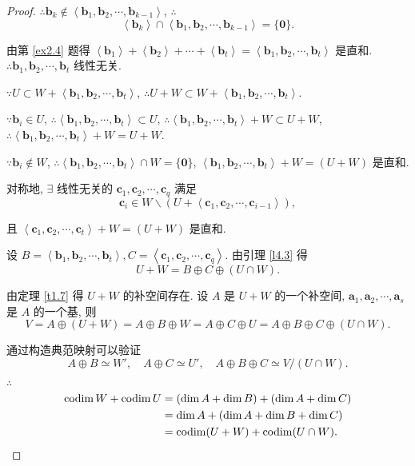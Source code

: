 \documentclass[color=black,device=normal,lang=cn,mode=geye]{elegantnote}
\begin{document}
\begin{proof}
    $\therefore\boldsymbol{b}_k\notin\left<\boldsymbol{b}_1,\boldsymbol{b}_2,\cdots,\boldsymbol{b}_{k-1}\right>$, $\therefore$
    \[\left<\boldsymbol{b}_k\right>\cap\left<\boldsymbol{b}_1,\boldsymbol{b}_2,\cdots,\boldsymbol{b}_{k-1}\right>=\{\boldsymbol{0}\}.\]

    由第 \ref{ex2.4} 题得 $\left<\boldsymbol{b}_1\right>+\left<\boldsymbol{b}_2\right>+\cdots+\left<\boldsymbol{b}_t\right>=\left<\boldsymbol{b}_1,\boldsymbol{b}_2,\cdots,\boldsymbol{b}_t\right>$ 是直和. $\therefore\boldsymbol{b}_1,\boldsymbol{b}_2,\cdots,\boldsymbol{b}_t$ 线性无关.

    $\because U\subset W+\left<\boldsymbol{b}_1,\boldsymbol{b}_2,\cdots,\boldsymbol{b}_t\right>$, $\therefore U+W\subset W+\left<\boldsymbol{b}_1,\boldsymbol{b}_2,\cdots,\boldsymbol{b}_t\right>$.
    
    $\because\boldsymbol{b}_i\in U$, $\therefore\left<\boldsymbol{b}_1,\boldsymbol{b}_2,\cdots,\boldsymbol{b}_t\right>\subset U$, $\therefore\left<\boldsymbol{b}_1,\boldsymbol{b}_2,\cdots,\boldsymbol{b}_t\right>+W\subset U+W$, $\therefore\left<\boldsymbol{b}_1,\boldsymbol{b}_2,\cdots,\boldsymbol{b}_t\right>+W=U+W$.

    $\because\boldsymbol{b}_i\notin W$, $\therefore\left<\boldsymbol{b}_1,\boldsymbol{b}_2,\cdots,\boldsymbol{b}_t\right>\cap W=\{\boldsymbol{0}\}$, $\left<\boldsymbol{b}_1,\boldsymbol{b}_2,\cdots,\boldsymbol{b}_t\right>+W=(U+W)$ 是直和.

    对称地, $\exists$ 线性无关的 $\boldsymbol{c}_1,\boldsymbol{c}_2,\cdots,\boldsymbol{c}_q$ 满足
    \[\boldsymbol{c}_i\in W\backslash(U+\left<\boldsymbol{c}_1,\boldsymbol{c}_2,\cdots,\boldsymbol{c}_{i-1}\right>),\]
    
    且 $\left<\boldsymbol{c}_1,\boldsymbol{c}_2,\cdots,\boldsymbol{c}_t\right>+W=(U+W)$ 是直和.

    设 $B=\left<\boldsymbol{b}_1,\boldsymbol{b}_2,\cdots,\boldsymbol{b}_t\right>,C=\left<\boldsymbol{c}_1,\boldsymbol{c}_2,\cdots,\boldsymbol{c}_q\right>$. 由引理 \ref{l4.3} 得
    \[U+W=B\oplus C\oplus(U\cap W).\]
        
    由定理 \ref{t1.7} 得 $U+W$ 的补空间存在. 设 $A$ 是 $U+W$ 的一个补空间, $\boldsymbol{a}_1,\boldsymbol{a}_2,\cdots,\boldsymbol{a}_s$ 是 $A$ 的一个基, 则
    \[V=A\oplus(U+W)=A\oplus B\oplus W=A\oplus C\oplus U=A\oplus B\oplus C\oplus(U\cap W).\]

    通过构造典范映射可以验证
    \[A\oplus B\simeq W',\quad A\oplus C\simeq U',\quad A\oplus B\oplus C\simeq V/(U\cap W).\]

    $\therefore$
    \begin{align*}
        \operatorname{codim} W+\operatorname{codim} U & =(\dim A+\dim B)+(\dim A+\dim C) \\
        & =\dim A+(\dim A+\dim B+\dim C) \\
        & =\operatorname{codim}(U+W)+\operatorname{codim}(U\cap W).\qedhere
    \end{align*}
\end{proof}
\end{document}
